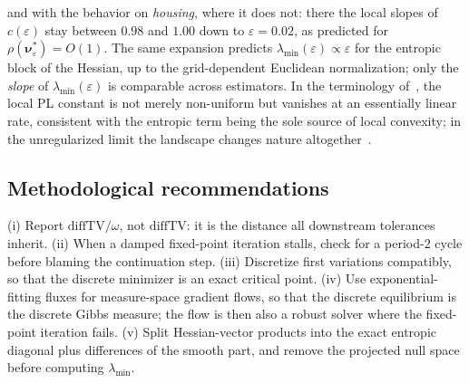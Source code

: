 \documentclass[11pt,leqno]{amsart}
\newcommand{\bnu}{\boldsymbol{\nu}}
\newcommand{\eps}{\varepsilon}
\numberwithin{equation}{section}
\theoremstyle{definition}
\begin{document}
and with the behavior on \emph{housing}, where it does not: there the
local slopes of $c(\eps)$ stay between $0.98$ and $1.00$ down to
$\eps=0.02$, as predicted for $\rho(\bnu^*_\eps)=O(1)$.  The
same expansion predicts $\lambda_{\min}(\eps)\propto\eps$ for the entropic
block of the Hessian, up to the grid-dependent Euclidean normalization;
only the \emph{slope} of $\lambda_{\min}(\eps)$ is comparable across
estimators.  In the terminology of~\cite{DaudinDelarue2025}, the local PL
constant is not merely non-uniform but vanishes at an essentially linear
rate, consistent with the entropic term being the sole source of local
convexity; in the unregularized limit the landscape changes nature
altogether~\cite{lu2020mean}.

\subsection{Methodological recommendations}
(i) Report $\mathrm{diffTV}/\omega$, not $\mathrm{diffTV}$: it is the
distance all downstream tolerances inherit.  (ii) When a damped fixed-point
iteration stalls, check for a period-2 cycle before blaming the
continuation step.  (iii) Discretize first variations compatibly, so that
the discrete minimizer is an exact critical point.  (iv) Use
exponential-fitting fluxes for measure-space gradient flows, so that the
discrete equilibrium is the discrete Gibbs measure; the flow is then also a
robust solver where the fixed-point iteration fails.  (v) Split
Hessian-vector products into the exact entropic diagonal plus differences
of the smooth part, and remove the projected null space before computing
$\lambda_{\min}$.
\end{document}
